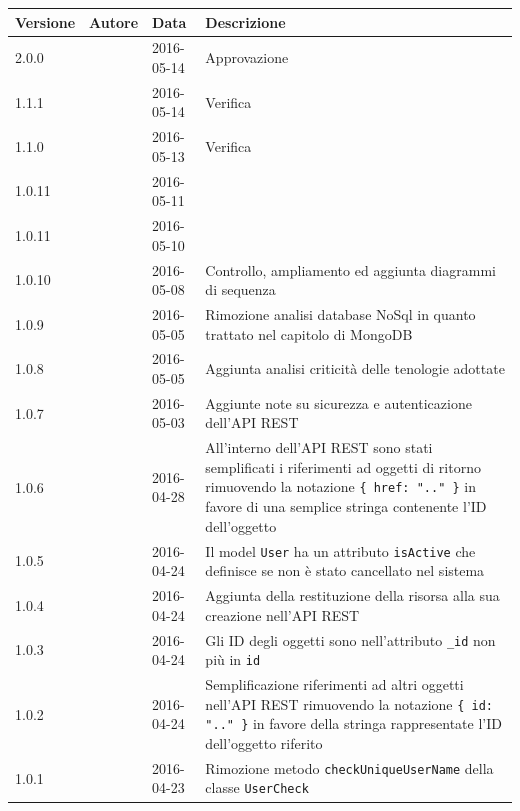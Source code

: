 \documentclass[12pt,a4paper]{article}
\begin{document}
\begin{center}
	\begin{longtable}[H]{p{} p{} p{} p{}}
		\toprule
		\textbf{Versione}	&	\textbf{Autore}	&	\textbf{Data}	&	\textbf{Descrizione}\\*
		\midrule
		\midrule
		2.0.0 & \AVE & 2016-05-14 & Approvazione \\*
		\midrule
		1.1.1 & \WS & 2016-05-14 & Verifica \\*
		\midrule
		1.1.0 & \NDC & 2016-05-13 & Verifica \\*
		\midrule
		1.0.11 & \TODO{} & 2016-05-11 &  \\*
		\midrule
		1.0.11 & \TODO{} & 2016-05-10 &  \\*
		\midrule
		1.0.10 & \TODO{} & 2016-05-08 & Controllo, ampliamento ed aggiunta diagrammi di sequenza \\*
		\midrule
		1.0.9 & \TODO{} & 2016-05-05 & Rimozione analisi database NoSql in quanto trattato nel capitolo di MongoDB \\*
		\midrule
		1.0.8 & \TODO{} & 2016-05-05 & Aggiunta analisi criticità delle tenologie adottate \\*
		\midrule
		1.0.7 & \TP{} & 2016-05-03 & Aggiunte note su sicurezza e autenticazione dell'API REST \\*
		\midrule
		1.0.6 & \TP{} & 2016-04-28 & All'interno dell'API REST sono stati semplificati i riferimenti ad oggetti di ritorno rimuovendo la notazione \texttt{\{ href: ".." \}} in favore di una semplice stringa contenente l'ID dell'oggetto \\*
		\midrule
		1.0.5 & \TP{} & 2016-04-24 & Il model \texttt{User} ha un attributo \texttt{isActive} che definisce se non è stato cancellato nel sistema \\*
		\midrule
		1.0.4 & \TP{} & 2016-04-24 & Aggiunta della restituzione della risorsa alla sua creazione nell'API REST \\*
		\midrule
		1.0.3 & \TP{} & 2016-04-24 & Gli ID degli oggetti sono nell'attributo \texttt{\_id} non più in \texttt{id} \\*
		\midrule
		1.0.2 & \TP{} & 2016-04-24 & Semplificazione riferimenti ad altri oggetti nell'API REST
			rimuovendo la notazione \texttt{\{ id: ".." \}} in favore della stringa rappresentate l'ID dell'oggetto
			riferito \\*
		\midrule
		1.0.1 & \TP{} & 2016-04-23 & Rimozione metodo \texttt{checkUniqueUserName} della classe
			\texttt{UserCheck} \\*

\end{longtable}
\end{center}
\end{document}
